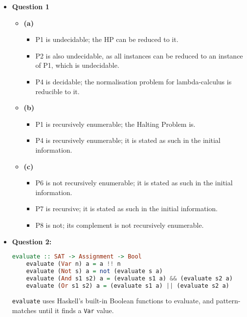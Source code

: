 \documentclass[12pt]{article}
\begin{document}
\maketitle
\begin{itemize}
  \item \textbf{Question 1}
    \begin{itemize}
      \item \textbf{(a)}\\
        \begin{itemize}
          \item P1 is undecidable; the HP can be reduced to it.
          \item P2 is also undecidable, as all instances can be reduced to an instance of P1, which is undecidable.
          \item P4 is decidable; the normalisation problem for lambda-calculus is reducible to it.
        \end{itemize}
      \item \textbf{(b)}\\
        \begin{itemize}
          \item P1 is recursively enumerable; the Halting Problem is.\\
          \item P4 is recursively enumerable; it is stated as such in the initial information.\\
        \end{itemize}
      \item \textbf{(c)}\\
        \begin{itemize}
          \item P6 is not recursively enumerable; it is stated as such in the initial information.\\
          \item P7 is recursive; it is stated as such in the initial information.\\
          \item P8 is not; its complement is not recursively enumerable.\\
        \end{itemize}
    \end{itemize}

    \pagebreak
  \item \textbf{Question 2:}
    \begin{lstlisting}[language=haskell]
    evaluate :: SAT -> Assignment -> Bool
    evaluate (Var n) a = a !! n
    evaluate (Not s) a = not (evaluate s a)
    evaluate (And s1 s2) a = (evaluate s1 a) && (evaluate s2 a)
    evaluate (Or s1 s2) a = (evaluate s1 a) || (evaluate s2 a)
    \end{lstlisting}
    \verb|evaluate| uses Haskell's built-in Boolean functions to evaluate, and pattern-matches until it finds a \verb|Var|
    value.


\end{itemize}
\end{document}
